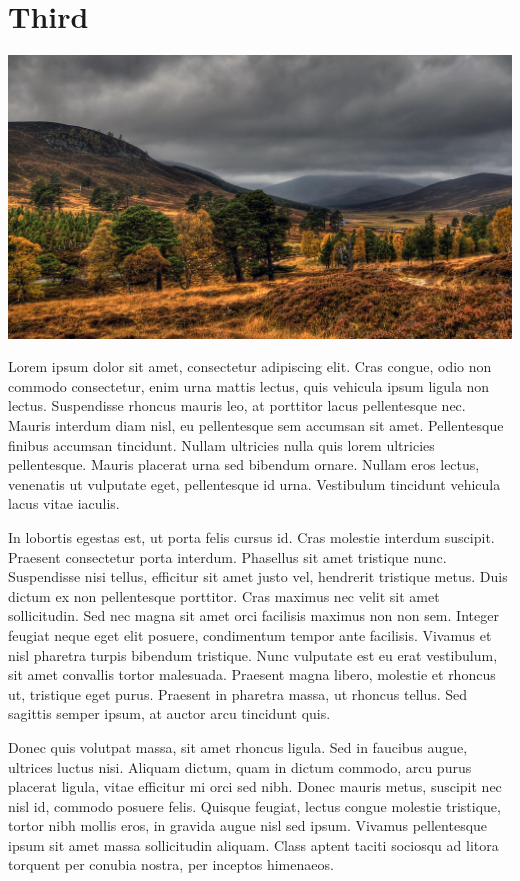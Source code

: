 \section{Third}

\includegraphics[width=\textwidth]{figures/4.jpg}

Lorem ipsum dolor sit amet, consectetur adipiscing elit. Cras congue, odio non commodo consectetur, enim urna mattis lectus, quis vehicula ipsum ligula non lectus. Suspendisse rhoncus mauris leo, at porttitor lacus pellentesque nec. Mauris interdum diam nisl, eu pellentesque sem accumsan sit amet. Pellentesque finibus accumsan tincidunt. Nullam ultricies nulla quis lorem ultricies pellentesque. Mauris placerat urna sed bibendum ornare. Nullam eros lectus, venenatis ut vulputate eget, pellentesque id urna. Vestibulum tincidunt vehicula lacus vitae iaculis.

In lobortis egestas est, ut porta felis cursus id. Cras molestie interdum suscipit. Praesent consectetur porta interdum. Phasellus sit amet tristique nunc. Suspendisse nisi tellus, efficitur sit amet justo vel, hendrerit tristique metus. Duis dictum ex non pellentesque porttitor. Cras maximus nec velit sit amet sollicitudin. Sed nec magna sit amet orci facilisis maximus non non sem. Integer feugiat neque eget elit posuere, condimentum tempor ante facilisis. Vivamus et nisl pharetra turpis bibendum tristique. Nunc vulputate est eu erat vestibulum, sit amet convallis tortor malesuada. Praesent magna libero, molestie et rhoncus ut, tristique eget purus. Praesent in pharetra massa, ut rhoncus tellus. Sed sagittis semper ipsum, at auctor arcu tincidunt quis.

Donec quis volutpat massa, sit amet rhoncus ligula. Sed in faucibus augue, ultrices luctus nisi. Aliquam dictum, quam in dictum commodo, arcu purus placerat ligula, vitae efficitur mi orci sed nibh. Donec mauris metus, suscipit nec nisl id, commodo posuere felis. Quisque feugiat, lectus congue molestie tristique, tortor nibh mollis eros, in gravida augue nisl sed ipsum. Vivamus pellentesque ipsum sit amet massa sollicitudin aliquam. Class aptent taciti sociosqu ad litora torquent per conubia nostra, per inceptos himenaeos.

